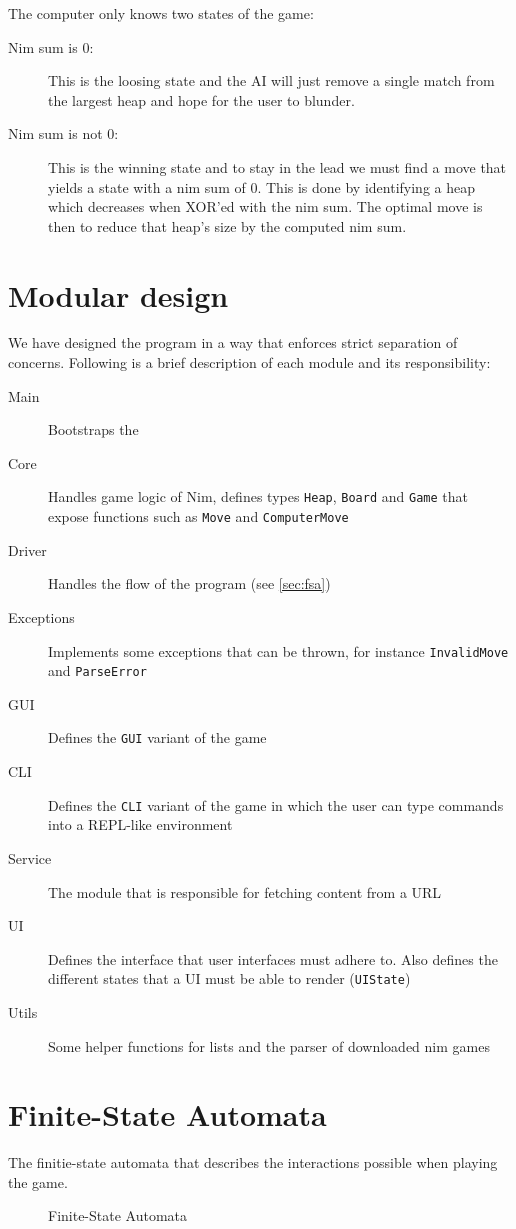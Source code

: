 \documentclass{article}
\begin{document}
The computer only knows two states of the game:
\begin{description}
\item[Nim sum is $0$:] This is the loosing state and the AI will just remove a single match from the largest heap and hope for the user to blunder.

\item[Nim sum is not $0$:] This is the winning state and to stay in the lead we must find a move that yields a state with a nim sum of $0$. This is done by identifying a heap which decreases when XOR'ed with the nim sum. The optimal move is then to reduce that heap's size by the computed nim sum.
\end{description}

\section{Modular design}
We have designed the program in a way that enforces strict separation of concerns. Following is a brief description of each module and its responsibility:


\begin{description}
\item[Main] Bootstraps the
\item[Core] Handles game logic of Nim, defines types \texttt{Heap}, \texttt{Board} and \texttt{Game} that expose functions such as \texttt{Move} and \texttt{ComputerMove}
\item[Driver] Handles the flow of the program (see \ref{sec:fsa})
\item[Exceptions] Implements some exceptions that can be thrown, for instance \texttt{InvalidMove} and \texttt{ParseError}
\item[GUI] Defines the \texttt{GUI} variant of the game
\item[CLI] Defines the \texttt{CLI} variant of the game in which the user can type commands into a REPL-like environment
\item[Service] The module that is responsible for fetching content from a URL
\item[UI] Defines the interface that user interfaces must adhere to. Also defines the different states that a UI must be able to render (\texttt{UIState})
\item[Utils] Some helper functions for lists and the parser of downloaded nim games
\end{description}

\section{Finite-State Automata}
The finitie-state automata that describes the interactions possible when playing the game.
\label{sec:fsa}
\begin{figure}[H]

\caption{Finite-State Automata}
\end{figure}
\end{document}
